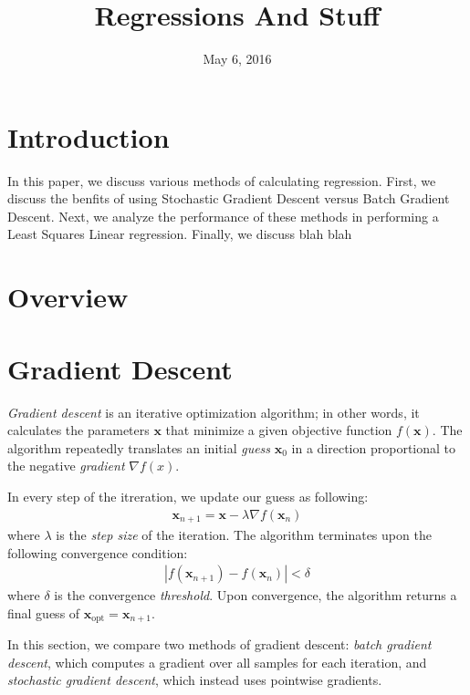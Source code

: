 \documentclass{paper}
\title{\textbf{Regressions And Stuff}}
\author{}
\date{May 6, 2016}
\begin{document}

\maketitle
\section{Introduction}

In this paper, we discuss various methods of calculating regression. First, we discuss the benfits of using Stochastic Gradient Descent versus Batch Gradient Descent. Next, we analyze the performance of these methods in performing a Least Squares Linear regression. Finally, we discuss blah blah

\section{Overview}


\section{Gradient Descent}

\emph{Gradient descent} is an iterative optimization algorithm; in other words, it calculates the parameters $\mathbf{x}$ that minimize a given objective function $f(\mathbf{x})$. The algorithm repeatedly translates an initial \emph{guess} $\mathbf{x}_0$ in a direction proportional to the negative \emph{gradient} $\nabla f(x)$.

In every step of the itreration, we update our guess as following:
\begin{align*}
\mathbf{x}_{n+1} = \mathbf{x} - \lambda \nabla f(\mathbf{x}_{n})
\end{align*}
where $\lambda$ is the \emph{step size} of the iteration. The algorithm terminates upon the following convergence condition: 
\begin{align*}
|f(\mathbf{x}_{n+1}) - f(\mathbf{x}_{n})| < \delta
\end{align*}
where $\delta$ is the convergence \emph{threshold}. Upon convergence, the algorithm returns a final guess of $\mathbf{x}_{\text{opt}} = \mathbf{x}_{n+1}$.

In this section, we compare two methods of gradient descent: \emph{batch gradient descent}, which computes a gradient over all samples for each iteration, and \emph{stochastic gradient descent}, which instead uses pointwise gradients.
\end{document}
